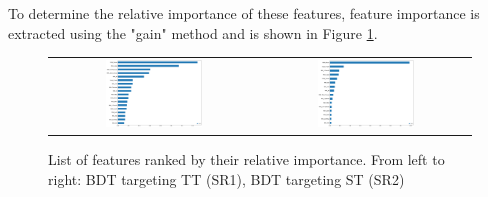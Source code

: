 To determine the relative importance of these features, feature importance is extracted using the "gain" method and is shown in Figure \ref{fig:Ranking}.

\begin{figure}[tbh!]
 \begin{center}
 \begin{tabular}{cc}
  \includegraphics[width=0.48\textwidth]{figures/Part3/BDT/TTranking}&
  \includegraphics[width=0.48\textwidth]{figures/Part3/BDT/STranking}\\
 \end{tabular}
 \caption{List of features ranked by their relative importance. From left to right: BDT targeting TT (SR1), BDT targeting ST (SR2)}
 \label{fig:Ranking}
 \end{center}
\end{figure}

